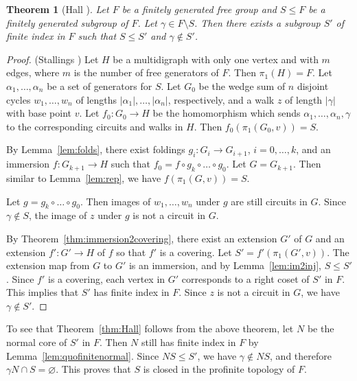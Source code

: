 \documentclass[11pt]{amsart}
\newtheorem{theorem}{Theorem}[section]
\theoremstyle{definition}
\theoremstyle{definition}
\numberwithin{equation}{section}
\begin{document}
\begin{theorem}[Hall \cite{Ha49}]\label{thm:Hall2} Let $F$ be a finitely generated free group and $S\leq F$ be a finitely generated subgroup of $F$. Let $\gamma\in F\setminus S$. Then there exists a subgroup $S'$ of finite index in $F$ such that $S\leq S'$ and $\gamma\not\in S'$.
\end{theorem}

\begin{proof} (Stallings \cite{St83}) Let $H$ be a multidigraph with only one vertex and with $m$ edges, where $m$ is the number of  free generators of $F$. Then $\pi_1(H)=F$. Let $\alpha_1,\dots, \alpha_n$ be a set of generators for $S$. Let $G_0$ be the wedge sum of $n$ disjoint cycles $w_1, \dots, w_n$ of lengths $|\alpha_1|, \dots, |\alpha_n|$, respectively, and a walk $z$ of length $|\gamma|$ with base point $v$. Let $f_0\colon G_0\to H$ be the homomorphism which sends $\alpha_1, \dots, \alpha_n, \gamma$ to the corresponding circuits and walks in $H$. Then $f_0(\pi_1(G_0, v))=S$.

By Lemma~\ref{lem:folds}, there exist foldings $g_i\colon G_i\to G_{i+1}$, $i=0,\dots, k$, and an immersion $f\colon G_{k+1}\to H$ such that $f_0=f\circ g_k\circ \dots\circ g_0$. Let $G=G_{k+1}$. Then similar to Lemma~\ref{lem:rep}, we have $f(\pi_1(G, v))=S$. 

Let $g=g_k\circ \dots\circ g_0$. Then images of $w_1, \dots, w_n$ under $g$ are still circuits in $G$. Since $\gamma\not\in S$, the image of $z$ under $g$ is not a circuit in $G$. 

By Theorem~\ref{thm:immersion2covering}, there exist an extension $G'$ of $G$ and an extension $f'\colon G'\to H$ of $f$ so that $f'$ is a covering. Let $S'=f'(\pi_1(G',v))$. The extension map from $G$ to $G'$ is an immersion, and by Lemma~\ref{lem:im2inj}, $S\leq S'$. Since $f'$ is a covering, each vertex in $G'$ corresponds to a right coset of $S'$ in $F$. This implies that $S'$ has finite index in $F$. Since $z$ is not a circuit in $G$, we have $\gamma\not\in S'$. 
\end{proof}

To see that Theorem~\ref{thm:Hall} follows from the above theorem, let $N$ be the normal core of $S'$ in $F$. Then $N$ still has finite index in $F$ by Lemma~\ref{lem:quofinitenormal}. Since $NS\leq S'$, we have $\gamma\not\in NS$, and therefore $\gamma N\cap S=\varnothing$. This proves that $S$ is closed in the profinite topology of $F$. 
\end{document}
